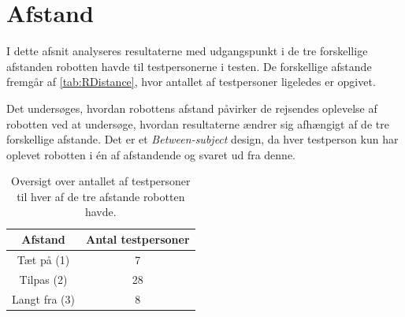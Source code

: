 \section{Afstand}
\label{DatabehandlingRAfstand}
%
I dette afsnit analyseres resultaterne med udgangspunkt i de tre forskellige afstanden robotten havde til testpersonerne i testen. De forskellige afstande fremgår af \autoref{tab:RDistance}, hvor antallet af testpersoner ligeledes er opgivet. 

Det undersøges, hvordan robottens afstand påvirker de rejsendes oplevelse af robotten ved at undersøge, hvordan resultaterne ændrer sig afhængigt af de tre forskellige afstande. Det er et \textit{Between-subject} design, da hver testperson kun har oplevet robotten i én af afstandende og svaret ud fra denne.
%
\begin{table}[H]
\centering
\begin{tabular}{c|c}
Afstand & Antal testpersoner \\ \hline
Tæt på (1) & 7    \\ \hline
Tilpas (2) & 28    \\ \hline
Langt fra (3) & 8     \\ 
\end{tabular}
\caption{Oversigt over antallet af testpersoner til hver af de tre afstande robotten havde.}
\label{tab:RDistance}
\end{table}
\noindent
%

